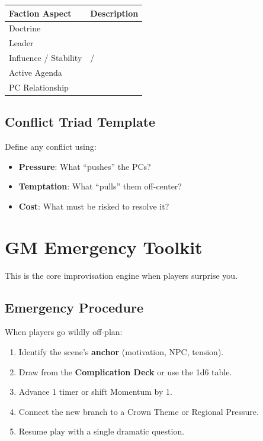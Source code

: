 \documentclass[11pt]{article}
\begin{document}
\begin{center}
\begin{longtable}{|p{4cm}|p{10cm}|}
\hline
\textbf{Faction Aspect} & \textbf{Description} \\
\hline
Doctrine & \underline{\phantom{XXXXXXXXXXXX}} \\
Leader & \underline{\phantom{XXXXXXXXXXXX}} \\
Influence / Stability & \underline{\phantom{X}} / \underline{\phantom{X}} \\
Active Agenda & \underline{\phantom{XXXXXXXXXXXX}} \\
PC Relationship & \underline{\phantom{X}} \\
\hline
\end{longtable}
\end{center}

\subsection{Conflict Triad Template}

Define any conflict using:

\begin{itemize}
    \item \textbf{Pressure}: What ``pushes'' the PCs?
    \item \textbf{Temptation}: What ``pulls'' them off-center?
    \item \textbf{Cost}: What must be risked to resolve it?
\end{itemize}


\section{GM Emergency Toolkit}
\label{appendix:emergency}

This is the core improvisation engine when players surprise you.

\subsection{Emergency Procedure}
When players go wildly off-plan:

\begin{enumerate}
    \item Identify the scene's \textbf{anchor} (motivation, NPC, tension).
    \item Draw from the \textbf{Complication Deck} or use the 1d6 table.
    \item Advance 1 timer or shift Momentum by 1.
    \item Connect the new branch to a Crown Theme or Regional Pressure.
    \item Resume play with a single dramatic question.
\end{enumerate}
\end{document}
